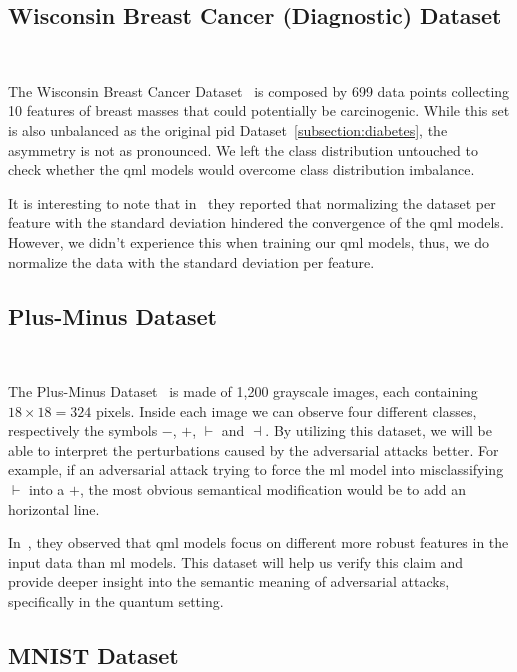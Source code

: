 \subsection{Wisconsin Breast Cancer (Diagnostic) Dataset} \

The Wisconsin Breast Cancer Dataset~\cite{street_nuclear_1993} is
composed by 699 data points collecting 10 features of breast masses
that could potentially be carcinogenic. While this set is also
unbalanced as the original \ac{pid} Dataset~\ref{subsection:diabetes},
the asymmetry is not as pronounced. We left the class distribution
untouched to check whether the \ac{qml} models would overcome class
distribution imbalance. \

It is interesting to note that in~\cite{winderl_quantum_2023}
they reported that normalizing the dataset per feature with the
standard deviation hindered the convergence of the \ac{qml} models.
However, we didn't experience this when training our \ac{qml} models,
thus, we do normalize the data with the standard deviation per feature. \

\subsection{Plus-Minus Dataset}\label{subsection:plus-minus} \

The Plus-Minus Dataset~\cite{wendlinger_comparative_2024} is made of
1,200 grayscale images, each containing \(18 \times 18 = 324\) pixels.
Inside each image we can observe four different classes, respectively
the symbols \(-\), \(+\), \(\vdash\) and \(\dashv\). By utilizing this
dataset, we will be able to interpret the perturbations caused by
the adversarial attacks better. For example, if an adversarial attack
trying to force the \ac{ml} model into misclassifying \(\vdash\) into
a \(+\), the most obvious semantical modification would be to add an
horizontal line. \

In~\cite{west_benchmarking_2023}, they observed that \ac{qml} models
focus on different more robust features in the input data than
\ac{ml} models. This dataset will help us verify this claim and
provide deeper insight into the semantic meaning of adversarial
attacks, specifically in the quantum setting. \

\subsection{MNIST Dataset}\label{subsection:mnist} \


